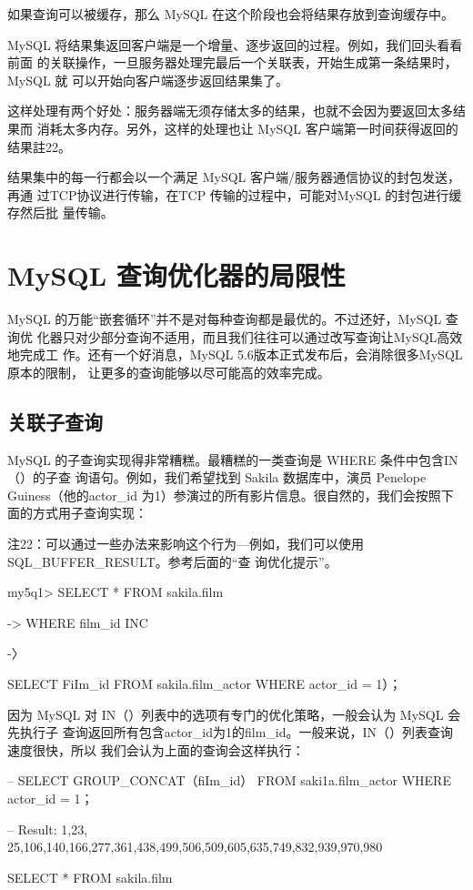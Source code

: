 如果查询可以被缓存，那么 MySQL 在这个阶段也会将结果存放到查询缓存中。

MySQL 将结果集返回客户端是一个增量、逐步返回的过程。例如，我们回头看看前面
的关联操作，一旦服务器处理完最后一个关联表，开始生成第一条结果时，MySQL 就
可以开始向客户端逐步返回结果集了。

这样处理有两个好处：服务器端无须存储太多的结果，也就不会因为要返回太多结果而
消耗太多内存。另外，这样的处理也让 MySQL 客户端第一时间获得返回的结果註22。

结果集中的每一行都会以一个满足 MySQL 客户端/服务器通信协议的封包发送，再通
过TCP协议进行传输，在TCP 传输的过程中，可能对MySQL 的封包进行缓存然后批
量传输。

\section{MySQL 查询优化器的局限性}
MySQL 的万能“嵌套循环”并不是对每种查询都是最优的。不过还好，MySQL 查询优
化器只对少部分查询不适用，而且我们往往可以通过改写查询让MySQL高效地完成工
作。还有一个好消息，MySQL 5.6版本正式发布后，会消除很多MySQL 原本的限制，
让更多的查询能够以尽可能高的效率完成。

\subsection{关联子查询}
MySQL 的子查询实现得非常糟糕。最糟糕的一类查询是 WHERE 条件中包含IN（）的子查
询语句。例如，我们希望找到 Sakila 数据库中，演员 Penelope Guiness（他的actor\_id
为1）参演过的所有影片信息。很自然的，我们会按照下面的方式用子查询实现：

注22：可以通过一些办法来影响这个行为—例如，我们可以使用 SQL\_BUFFER\_RESULT。参考后面的“查
询优化提示”。

my5q1> SELECT * FROM sakila.film

-> WHERE film\_id INC

-〉

SELECT FiIm\_id FROM sakila.film\_actor WHERE actor\_id = 1）；

因为 MySQL 对 IN（）列表中的选项有专门的优化策略，一般会认为 MySQL 会先执行子
查询返回所有包含actor\_id为1的film\_id。一般来说，IN（）列表查询速度很快，所以
我们会认为上面的查询会这样执行：

-- SELECT GROUP\_CONCAT（fiIm\_id） FROM saki1a.film\_actor WHERE actor\_id = 1；

-- Result: 1,23, 25,106,140,166,277,361,438,499,506,509,605,635,749,832,939,970,980

SELECT * FROM sakila.film

